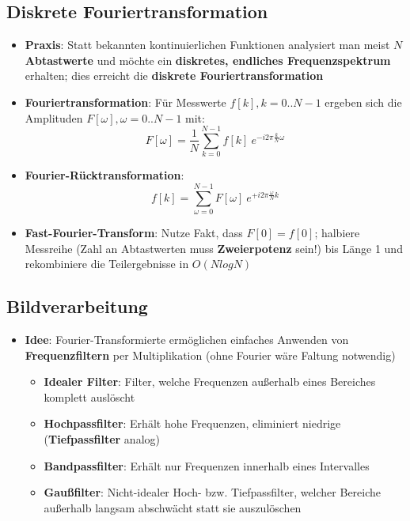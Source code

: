 \subsection{Diskrete Fouriertransformation}%
\label{four:sub:diskrete_fouriertransformation}

\begin{itemize}
	\item \textbf{Praxis}: Statt bekannten kontinuierlichen Funktionen analysiert man meist $N$ \textbf{Abtastwerte} und möchte ein \textbf{diskretes, endliches Frequenzspektrum} erhalten; dies erreicht die \textbf{diskrete Fouriertransformation}
	\item \textbf{Fouriertransformation}: Für Messwerte $f[k], k = 0..N-1$ ergeben sich die Amplituden $F[\omega], \omega = 0..N-1$ mit:
	$$F[\omega] = \frac{1}{N}\sum^{N-1}_{k=0}f[k]\ e^{-i2\pi\frac{k}{N}\omega}$$
	\item \textbf{Fourier-Rücktransformation}:
	$$f[k] = \sum^{N-1}_{\omega=0}F[\omega]\ e^{+i2\pi\frac{\omega}{N}k}$$
	\item \textbf{Fast-Fourier-Transform}: Nutze Fakt, dass $F[0] = f[0]$; halbiere Messreihe (Zahl an Abtastwerten muss \textbf{Zweierpotenz} sein!) bis Länge 1 und rekombiniere die Teilergebnisse in $O(N log N)$
\end{itemize}

\subsection{Bildverarbeitung}%
\label{four:sub:bildverarbeitung}

\begin{itemize}
	\item \textbf{Idee}: Fourier-Transformierte ermöglichen einfaches Anwenden von \textbf{Frequenzfiltern} per Multiplikation (ohne Fourier wäre Faltung notwendig)
	\begin{itemize}
		\item \textbf{Idealer Filter}: Filter, welche Frequenzen außerhalb eines Bereiches komplett auslöscht
		\item \textbf{Hochpassfilter}: Erhält hohe Frequenzen, eliminiert niedrige (\textbf{Tiefpassfilter} analog)
		\item \textbf{Bandpassfilter}: Erhält nur Frequenzen innerhalb eines Intervalles
		\item \textbf{Gaußfilter}: Nicht-idealer Hoch- bzw. Tiefpassfilter, welcher Bereiche außerhalb langsam abschwächt statt sie auszulöschen
	\end{itemize}
\end{itemize}

